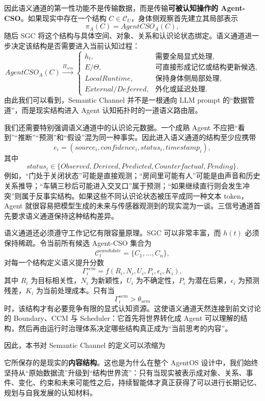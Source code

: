 因此语义通道的第一性功能不是传输数据，而是传输\textbf{可被认知操作的 Agent-CSO}。如果现实中存在一个结构 $C\in\mathcal{C}_{U}$，身体侧观察首先建立其局部表示
\[
\pi_A(C)=AgentCSO_A(C),
\]
随后 SGC 将这个结构与具体空间、对象、关系和认识论状态绑定。语义通道进一步决定该结构是否需要进入当前认知过程：
\[
AgentCSO_A(C)
\xrightarrow{\Pi_{sem}}
\begin{cases}
h_t, & \text{需要全局显式处理},\\
E/\Theta, & \text{可直接形成记忆或结构更新候选},\\
LocalRuntime, & \text{保持身体侧局部处理},\\
External/Deferred, & \text{外化或延迟处理}.
\end{cases}
\]
由此我们可以看到，Semantic Channel 并不是一根通向 LLM prompt 的“数据管道”，而是现实结构进入 Agent 认知拓扑时的一道语义路由层。

我们还需要特别强调语义通道中的认识论元数据。一个成熟 Agent 不应把“看到”“推断”“预测”和“假设”混为同一种事实。因此进入语义通道的结构至少应携带
\[
e_i
=
(
source_i,
confidence_i,
status_i,
timestamp_i
),
\]
其中
\[
status_i
\in
\{
Observed,
Derived,
Predicted,
Counterfactual,
Pending
\}.
\]
例如，“门处于关闭状态”可能是直接观测；“房间里可能有人”可能是由声音和历史关系推导；“车辆三秒后可能进入交叉口”属于预测；“如果继续直行则会发生冲突”则属于反事实结构。如果这些不同认识论状态被压平成同一种文本 token，Agent 就很容易把模型生成的未来与传感器观测到的现实混为一谈。三信号通道首先要求语义通道保持这种结构差异。

语义通道还必须遵守工作记忆有限容量原理。SGC 可以非常丰富，而 $h(t)$ 必须保持稀疏。令当前所有候选 Agent-CSO 集合为
\[
\mathcal{C}_t^{candidate}
=
\{C_1,\ldots,C_n\},
\]
对每一个结构定义语义提升分数
\[
\Gamma_i^{sem}
=
f
\left(
R_i,
N_i,
U_i,
P_i,
\epsilon_i,
K_i
\right),
\]
其中 $R_i$ 为目标相关性，$N_i$ 为新颖性，$U_i$ 为不确定性，$P_i$ 为潜在后果，$\epsilon_i$ 为预测残差，$K_i$ 为当前处理成本。只有当
\[
\Gamma_i^{sem}>\theta_{sem}
\]
时，该结构才有必要竞争有限的显式认知资源。这使语义通道天然连接到前文讨论的 Boundary、CCM 与 Scheduler：它首先将世界转化成 Agent 可以理解的结构，然后再由运行时治理体系决定哪些结构真正成为“当前思考的内容”。

因此，本书对 Semantic Channel 的定义可以浓缩为
\begin{statementbox}
\centering
{}
\end{statementbox}
它所保存的是现实的\textbf{内容结构}。这也是为什么在整个 AgentOS 设计中，我们始终坚持从“原始数据流”升级到“结构世界流”：只有当现实被表示成对象、关系、事件、变化、约束和未来可能性之后，持续智能体才真正获得了可以进行长期记忆、规划与自我发展的认知材料。

